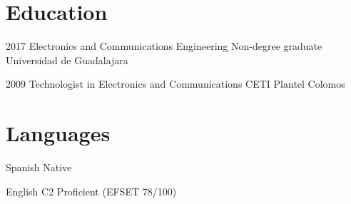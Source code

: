 \documentclass[10pt, letterpaper]{article} %
\begin{document}

\section{Education}

\dateitem
{2017}
{Electronics and Communications Engineering Non-degree graduate}
{Universidad de Guadalajara}


\dateitem
{2009}
{Technologist in Electronics and Communications}
{CETI Plantel Colomos}


\section{Languages}

\langitem
{Spanish}
{Native}

\langitem
{English}
{C2 Proficient (EFSET 78/100)}

\end{document}
